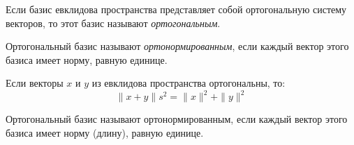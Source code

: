 \begin{definition}
  Если базис евклидова пространства представляет собой ортогональную систему векторов,
  то этот базис называют \textit{ортогональным}.
\end{definition}

\begin{definition}
  Ортогональный базис называют \textit{ортонормированным}, если каждый
вектор этого базиса имеет норму, равную единице.
\end{definition}

\begin{theorem}
  Если векторы $x$ и $y$ из евклидова пространства ортогональны, то: \[
    \|x + y\|s^2 = \|x\|^2 + \|y\|^2
  \] 
\end{theorem}

\begin{definition}
  Ортогональный базис называют ортонормированным, если каждый вектор этого базиса имеет норму (длину), равную единице.
\end{definition}

